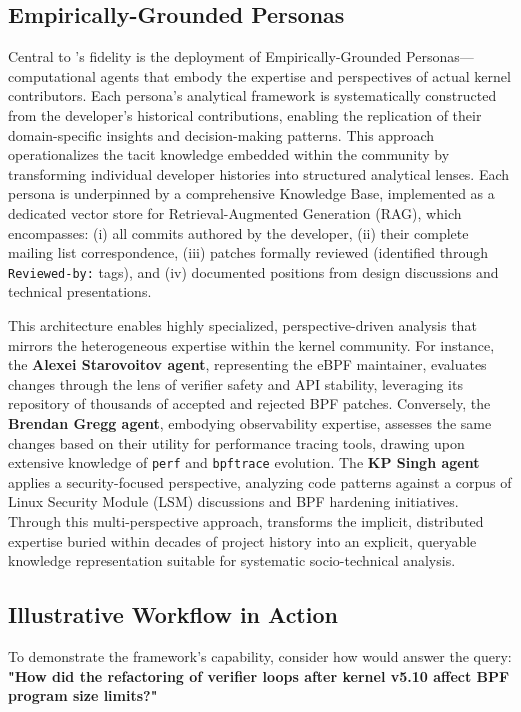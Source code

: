 \subsection{Empirically-Grounded Personas}

Central to \sys's fidelity is the deployment of Empirically-Grounded Personas—computational agents that embody the expertise and perspectives of actual kernel contributors. Each persona's analytical framework is systematically constructed from the developer's historical contributions, enabling the replication of their domain-specific insights and decision-making patterns. This approach operationalizes the tacit knowledge embedded within the community by transforming individual developer histories into structured analytical lenses. Each persona is underpinned by a comprehensive Knowledge Base, implemented as a dedicated vector store for Retrieval-Augmented Generation (RAG), which encompasses: (i) all commits authored by the developer, (ii) their complete mailing list correspondence, (iii) patches formally reviewed (identified through \texttt{Reviewed-by:} tags), and (iv) documented positions from design discussions and technical presentations.

This architecture enables highly specialized, perspective-driven analysis that mirrors the heterogeneous expertise within the kernel community. For instance, the \textbf{Alexei Starovoitov agent}, representing the eBPF maintainer, evaluates changes through the lens of verifier safety and API stability, leveraging its repository of thousands of accepted and rejected BPF patches. Conversely, the \textbf{Brendan Gregg agent}, embodying observability expertise, assesses the same changes based on their utility for performance tracing tools, drawing upon extensive knowledge of \texttt{perf} and \texttt{bpftrace} evolution. The \textbf{KP Singh agent} applies a security-focused perspective, analyzing code patterns against a corpus of Linux Security Module (LSM) discussions and BPF hardening initiatives. Through this multi-perspective approach, \sys transforms the implicit, distributed expertise buried within decades of project history into an explicit, queryable knowledge representation suitable for systematic socio-technical analysis.


\subsection{Illustrative Workflow in Action}

To demonstrate the framework's capability, consider how \sys would answer the query: \textbf{"How did the refactoring of verifier loops after kernel v5.10 affect BPF program size limits?"}


